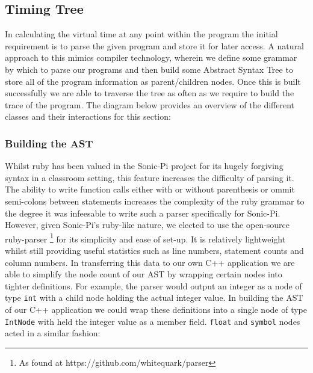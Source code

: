 \documentclass[11pt]{scrartcl}
\begin{document}


\subsection{Timing Tree}
In calculating the virtual time at any point within the program the initial 
requirement is to parse the given program and store it for later access. A 
natural approach to this mimics compiler technology, wherein we define some
grammar by which to parse our programs and then build some Abstract Syntax Tree 
to store all of the program information as parent/children nodes. Once this 
is built successfully we are able to traverse the tree as often as we require 
to build the trace of the program. The diagram below provides an overview of the 
different classes and their interactions for this section:




\subsubsection{Building the AST}
Whilst ruby has been valued in the Sonic-Pi project for its hugely forgiving
syntax in a classroom setting, this feature increases the difficulty of parsing 
it. The ability to write function calls either with or without parenthesis 
or ommit semi-colons between statements increases the complexity of the ruby 
grammar to the degree it was infeesable to write such a parser specifically 
for Sonic-Pi. However, given Sonic-Pi's ruby-like nature, we elected to use 
the open-source ruby-parser \footnote{As found at https://github.com/whitequark/parser}
for its simplicity and ease of set-up. It is relatively lightweight whilst 
still providing useful statistics such as line numbers, statement counts and
column numbers. In transferring this data to our own C++ application we are 
able to simplify the node count of our AST by wrapping certain nodes into 
tighter definitions. For example, the parser would output an integer as a node 
of type \texttt{int} with a child node holding the actual integer value. In 
building the AST of our C++ application we could wrap these definitions into 
a single node of type \texttt{IntNode} with held the integer value as a 
member field. \texttt{float} and \texttt{symbol} nodes acted in a similar
fashion:
\end{document}
